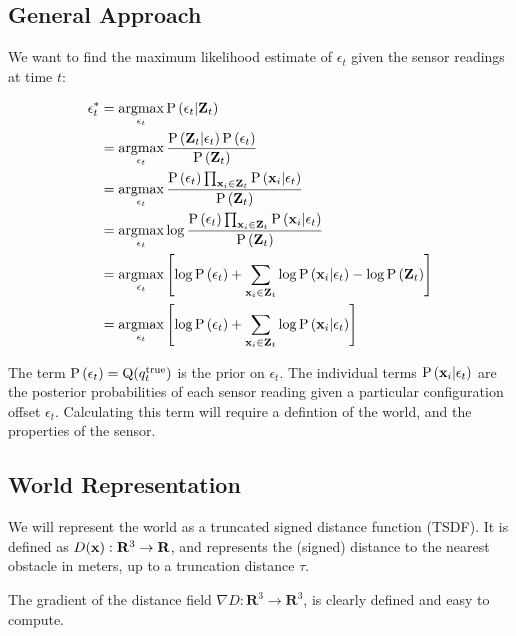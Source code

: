 \documentclass{article}
\begin{document}
\subsection{General Approach} 

We want to find the maximum likelihood estimate of $\epsilon_t$ given the sensor readings at time $t$:

\begin{align}
\epsilon^*_t  &= \argmax_{\epsilon_t} \Prob\left(\epsilon_t | \Z_t\right)  \\
							&= \argmax_{\epsilon_t} \frac{\Prob\left(\Z_t |	\epsilon_t\right)\Prob\left(\epsilon_t\right)}{\Prob\left(\Z_t\right)} \\
							&= \argmax_{\epsilon_t} \frac{ \Prob\left(\epsilon_t\right)\prod_{\bx_i \in \Z_t}{\Prob\left(\bx_i | \epsilon_t\right)}}{\Prob\left(\Z_t\right)}  \\
							&= \argmax_{\epsilon_t} \log \frac{ \Prob\left(\epsilon_t\right)\prod_{\bx_i \in \Z_t}{\Prob\left(\bx_i |	\epsilon_t\right)}}{\Prob\left(\Z_t\right)}  \\
						    &= \argmax_{\epsilon_t}  \left[\log\Prob\left(\epsilon_t\right) + \sum_{\bx_i \in \Z_t}{\log \Prob\left(\bx_i |	\epsilon_t\right)} - \log \Prob\left(\Z_t\right)\right] \\
						    &= \argmax_{\epsilon_t}  \left[\log\Prob\left(\epsilon_t\right) + \sum_{\bx_i \in \Z_t}{\log \Prob\left(\bx_i |	\epsilon_t\right)}\right]
\end{align}

The term $\text{P}\left(\epsilon_t\right) = \text{Q}(q_t^{\text{true}})$ is the prior on $\epsilon_t$. The individual terms $\text{P}\left(\mathbf{x}_i | \epsilon_t\right)$ are the posterior probabilities of each sensor reading given a particular configuration
offset $\epsilon_t$. Calculating this term will require a defintion of the world, and the properties of the sensor.

\subsection{World Representation}

We will represent the world as a truncated signed distance function (TSDF). It
is defined as $D(\mathbf{x}) : \mathbf{R}^3 \to \mathbf{R}$, and represents the
(signed) distance to the nearest obstacle in meters, up to a truncation distance $\tau$.

The gradient of the distance field $\nabla D : \mathbf{R}^3 \to \mathbf{R}^3$,
is clearly defined and easy to compute.
\end{document}

